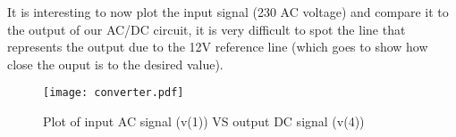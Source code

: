 It is interesting to now plot the input signal (230 AC voltage) and compare it to the output of our AC/DC circuit, it is very difficult to spot the line that represents the output due to the 12V reference line (which goes to show how close the ouput is to the desired value). 

\begin{figure}[h]
	\centering
	\texttt{[image: converter.pdf]}
	\caption{Plot of input AC signal (v(1)) VS output DC signal (v(4))}
	\label{fig:sim_converter}
\end{figure}
\pagebreak

